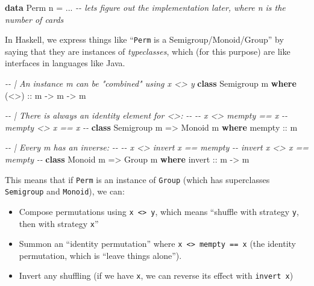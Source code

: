 \documentclass[]{article}
\newenvironment{Shaded}{}{}
\newcommand{\CommentTok}[1]{\textcolor[rgb]{0.38,0.63,0.69}{\textit{#1}}}
\newcommand{\DataTypeTok}[1]{\textcolor[rgb]{0.56,0.13,0.00}{#1}}
\newcommand{\KeywordTok}[1]{\textcolor[rgb]{0.00,0.44,0.13}{\textbf{#1}}}
\newcommand{\NormalTok}[1]{#1}
\newcommand{\OperatorTok}[1]{\textcolor[rgb]{0.40,0.40,0.40}{#1}}
\newcommand{\OtherTok}[1]{\textcolor[rgb]{0.00,0.44,0.13}{#1}}
\begin{document}
\begin{Shaded}
\begin{Highlighting}[]
\KeywordTok{data} \DataTypeTok{Perm}\NormalTok{ n }\OtherTok{=} \OperatorTok{...} \CommentTok{{-}{-} let\textquotesingle{}s figure out the implementation later, where n is the number of cards}
\end{Highlighting}
\end{Shaded}

In Haskell, we express things like ``\texttt{Perm} is a Semigroup/Monoid/Group''
by saying that they are instances of \emph{typeclasses}, which (for this
purpose) are like interfaces in languages like Java.

\begin{Shaded}
\begin{Highlighting}[]
\CommentTok{{-}{-} | An instance m can be "combined" using \textasciigrave{}x <> y\textasciigrave{}}
\KeywordTok{class} \DataTypeTok{Semigroup}\NormalTok{ m }\KeywordTok{where}
\OtherTok{    (<>) ::}\NormalTok{ m }\OtherTok{{-}>}\NormalTok{ m }\OtherTok{{-}>}\NormalTok{ m}

\CommentTok{{-}{-} | There is always an identity element for <>:}
\CommentTok{{-}{-}}
\CommentTok{{-}{-} x <> mempty == x}
\CommentTok{{-}{-} mempty <> x == x}
\CommentTok{{-}{-}}
\KeywordTok{class} \DataTypeTok{Semigroup}\NormalTok{ m }\OtherTok{=>} \DataTypeTok{Monoid}\NormalTok{ m }\KeywordTok{where}
\OtherTok{    mempty ::}\NormalTok{ m}

\CommentTok{{-}{-} | Every m has an inverse:}
\CommentTok{{-}{-}}
\CommentTok{{-}{-} x <> invert x == mempty}
\CommentTok{{-}{-} invert x <> x == mempty}
\CommentTok{{-}{-}}
\KeywordTok{class} \DataTypeTok{Monoid}\NormalTok{ m }\OtherTok{=>} \DataTypeTok{Group}\NormalTok{ m }\KeywordTok{where}
\OtherTok{    invert ::}\NormalTok{ m }\OtherTok{{-}>}\NormalTok{ m}
\end{Highlighting}
\end{Shaded}

This means that if \texttt{Perm} is an instance of \texttt{Group} (which has
superclasses \texttt{Semigroup} and \texttt{Monoid}), we can:

\begin{itemize}
\tightlist
\item
  Compose permutations using \texttt{x\ \textless{}\textgreater{}\ y}, which
  means ``shuffle with strategy \texttt{y}, then with strategy \texttt{x}''
\item
  Summon an ``identity permutation'' where
  \texttt{x\ \textless{}\textgreater{}\ mempty\ ==\ x} (the identity
  permutation, which is ``leave things alone'').
\item
  Invert any shuffling (if we have \texttt{x}, we can reverse its effect with
  \texttt{invert\ x})
\end{itemize}
\end{document}
